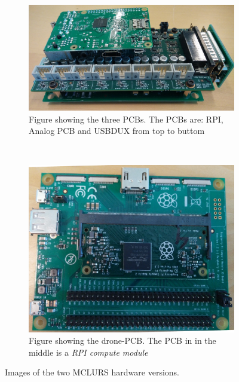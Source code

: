 \begin{figure}[H]
    \centering
    \begin{subfigure}[b]{0.45\textwidth}
        \includegraphics[width=\textwidth]{figures/batbox}
        \caption{Figure showing the three PCBs. The PCBs are: RPI, Analog PCB and USBDUX from top to buttom}
        \label{fig:mclurs:pcbstack}
    \end{subfigure}
    ~ %
    \begin{subfigure}[b]{0.45\textwidth}
        \includegraphics[width=\textwidth]{figures/drone_pcb}
        \caption{Figure showing the drone-PCB. The PCB in in the middle is a \textit{RPI compute module}}
        \label{fig:mclurs:droneboard}
    \end{subfigure}
    \caption{Images of the two MCLURS hardware versions.}\label{fig:existingsystem:hardware}
\end{figure}

